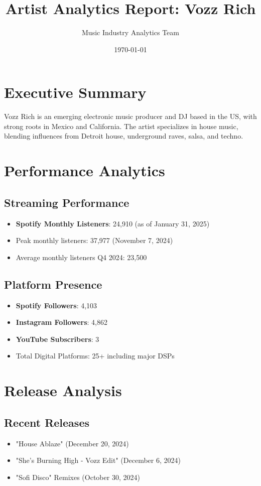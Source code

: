 \documentclass{article}
\title{Artist Analytics Report: Vozz Rich}
\date{\today}
\author{Music Industry Analytics Team}
\begin{document}
\maketitle

\section{Executive Summary}
Vozz Rich is an emerging electronic music producer and DJ based in the US, with strong roots in Mexico and California. The artist specializes in house music, blending influences from Detroit house, underground raves, salsa, and techno.

\section{Performance Analytics}

\subsection{Streaming Performance}
\begin{itemize}
    \item \textbf{Spotify Monthly Listeners}: 24,910 (as of January 31, 2025)
    \item Peak monthly listeners: 37,977 (November 7, 2024)
    \item Average monthly listeners Q4 2024: 23,500
\end{itemize}

\subsection{Platform Presence}
\begin{itemize}
    \item \textbf{Spotify Followers}: 4,103
    \item \textbf{Instagram Followers}: 4,862
    \item \textbf{YouTube Subscribers}: 3
    \item Total Digital Platforms: 25+ including major DSPs
\end{itemize}

\section{Release Analysis}

\subsection{Recent Releases}
\begin{itemize}
    \item "House Ablaze" (December 20, 2024)
    \item "She's Burning High - Vozz Edit" (December 6, 2024)
    \item "Sofi Disco" Remixes (October 30, 2024)
\end{itemize}
\end{document}
